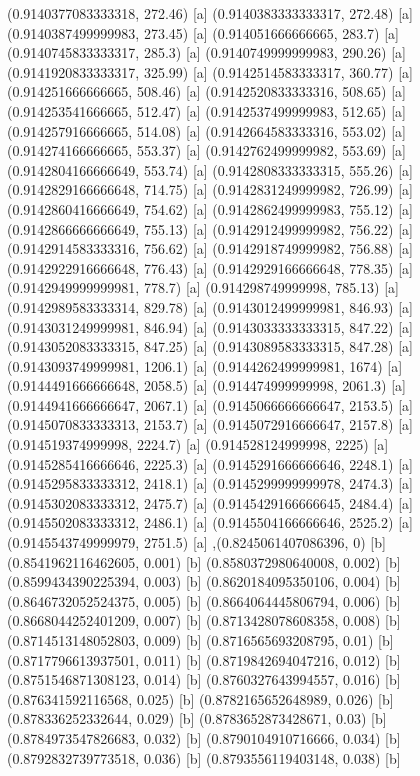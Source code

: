{{{(0.9140377083333318, 272.46) [a] 
(0.9140383333333317, 272.48) [a] 
(0.9140387499999983, 273.45) [a] 
(0.914051666666665, 283.7) [a] 
(0.9140745833333317, 285.3) [a] 
(0.9140749999999983, 290.26) [a] 
(0.9141920833333317, 325.99) [a] 
(0.9142514583333317, 360.77) [a] 
(0.914251666666665, 508.46) [a] 
(0.9142520833333316, 508.65) [a] 
(0.914253541666665, 512.47) [a] 
(0.9142537499999983, 512.65) [a] 
(0.914257916666665, 514.08) [a] 
(0.9142664583333316, 553.02) [a] 
(0.914274166666665, 553.37) [a] 
(0.9142762499999982, 553.69) [a] 
(0.9142804166666649, 553.74) [a] 
(0.9142808333333315, 555.26) [a] 
(0.9142829166666648, 714.75) [a] 
(0.9142831249999982, 726.99) [a] 
(0.9142860416666649, 754.62) [a] 
(0.9142862499999983, 755.12) [a] 
(0.9142866666666649, 755.13) [a] 
(0.9142912499999982, 756.22) [a] 
(0.9142914583333316, 756.62) [a] 
(0.9142918749999982, 756.88) [a] 
(0.9142922916666648, 776.43) [a] 
(0.9142929166666648, 778.35) [a] 
(0.9142949999999981, 778.7) [a] 
(0.914298749999998, 785.13) [a] 
(0.9142989583333314, 829.78) [a] 
(0.9143012499999981, 846.93) [a] 
(0.9143031249999981, 846.94) [a] 
(0.9143033333333315, 847.22) [a] 
(0.9143052083333315, 847.25) [a] 
(0.9143089583333315, 847.28) [a] 
(0.9143093749999981, 1206.1) [a] 
(0.9144262499999981, 1674) [a] 
(0.9144491666666648, 2058.5) [a] 
(0.914474999999998, 2061.3) [a] 
(0.9144941666666647, 2067.1) [a] 
(0.9145066666666647, 2153.5) [a] 
(0.9145070833333313, 2153.7) [a] 
(0.9145072916666647, 2157.8) [a] 
(0.914519374999998, 2224.7) [a] 
(0.914528124999998, 2225) [a] 
(0.9145285416666646, 2225.3) [a] 
(0.9145291666666646, 2248.1) [a] 
(0.9145295833333312, 2418.1) [a] 
(0.9145299999999978, 2474.3) [a] 
(0.9145302083333312, 2475.7) [a] 
(0.9145429166666645, 2484.4) [a] 
(0.9145502083333312, 2486.1) [a] 
(0.9145504166666646, 2525.2) [a] 
(0.9145543749999979, 2751.5) [a] 
},{(0.8245061407086396, 0) [b] 
(0.8541962116462605, 0.001) [b] 
(0.8580372980640008, 0.002) [b] 
(0.8599434390225394, 0.003) [b] 
(0.8620184095350106, 0.004) [b] 
(0.8646732052524375, 0.005) [b] 
(0.8664064445806794, 0.006) [b] 
(0.8668044252401209, 0.007) [b] 
(0.8713428078608358, 0.008) [b] 
(0.8714513148052803, 0.009) [b] 
(0.8716565693208795, 0.01) [b] 
(0.8717796613937501, 0.011) [b] 
(0.8719842694047216, 0.012) [b] 
(0.8751546871308123, 0.014) [b] 
(0.8760327643994557, 0.016) [b] 
(0.876341592116568, 0.025) [b] 
(0.8782165652648989, 0.026) [b] 
(0.878336252332644, 0.029) [b] 
(0.8783652873428671, 0.03) [b] 
(0.8784973547826683, 0.032) [b] 
(0.8790104910716666, 0.034) [b] 
(0.8792832739773518, 0.036) [b] 
(0.8793556119403148, 0.038) [b] 
}}}
